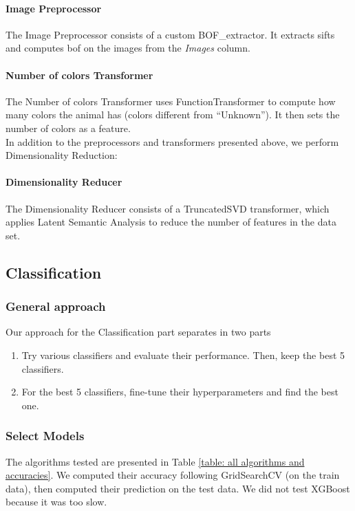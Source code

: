 \documentclass[12pt]{article}
\begin{document}
\paragraph{Image Preprocessor} The Image Preprocessor consists of a custom  BOF\_extractor. It extracts \glspl{sift} and computes \gls{bof} on the images from the \textit{Images} column.

\paragraph{Number of colors Transformer} The Number of colors Transformer uses FunctionTransformer to compute how many colors the animal has (\ie colors different from ``Unknown''). It then sets the number of colors as a feature. \\
In addition to the preprocessors and transformers presented above, we perform Dimensionality Reduction:

\paragraph{Dimensionality Reducer} The Dimensionality Reducer consists of a TruncatedSVD transformer, which applies Latent Semantic Analysis to reduce the number of features in the data set.

\subsection{Classification}

\subsubsection{General approach}
Our approach for the Classification part separates in two parts
\begin{enumerate}
    \item Try various classifiers and evaluate their performance. Then, keep the best 5 classifiers.
    \item For the best 5 classifiers, fine-tune their hyperparameters and find the best one.
\end{enumerate}

\subsubsection{Select Models}
The algorithms tested are presented in Table \ref{table: all algorithms and accuracies}. We computed their accuracy following GridSearchCV (on the train data), then computed their prediction on the test data. We did not test XGBoost because it was too slow.
\end{document}
